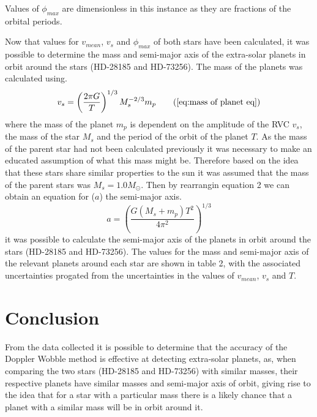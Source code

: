 \documentclass[]{article}
\begin{document}
Values of $\phi_{max}$ are dimensionless in this instance as they are
fractions of the orbital periods.
\par
Now that values for $v_{mean}$, $v_{s}$ and $\phi_{max}$ of both stars have 
been calculated, it was possible to determine the mass and semi-major axis of the
extra-solar planets in orbit around the stars (HD-28185 and HD-73256).
The mass of the planets was calculated using.
\begin{equation}
  v_s = \left(\frac{2\pi G}{T}\right)^{1/3}M_s^{-2/3}m_p \tag{\ref{eq:mass of planet eq}}
\end{equation}
where the mass of the planet $m_p $ is dependent on the amplitude of the RVC $v_{s}$, the mass of the star $M_s$ and the period of the orbit of the planet $T$.
As the mass of the parent star had not been calculated previously it was necessary to
make an educated assumption of what this mass might be. Therefore based on the idea 
that these stars share similar properties to the sun it was assumed that the mass of
the parent stars was $M_s = 1.0M_{\odot}$. Then by rearrangin equation 2 we can 
obtain an equation for ($a$) the semi-major axis.
\begin{equation}
  a = \left(\frac{G(M_s+m_p)T^2}{4\pi^2}\right)^{1/3}
  \end{equation}
it was possible to calculate the semi-major axis of the planets in orbit around the
stars (HD-28185 and HD-73256). The values for the mass and semi-major axis of the 
relevant planets around each star are shown in table 2, with the associated 
uncertainties progated from the uncertainties in the values of $v_{mean}$, $v_{s}$
and $T$.


  \par
  
\section*{Conclusion}
From the data collected it is possible to determine that the 
accuracy of the Doppler Wobble method is effective at detecting 
extra-solar planets, as, when comparing the two stars (HD-28185 and HD-73256)
with similar masses, their respective planets have 
similar masses and semi-major axis of orbit, giving rise to the 
idea that for a star with a particular mass there is a likely chance
that a planet with a similar mass will be in orbit around it.
\par


\end{document}
